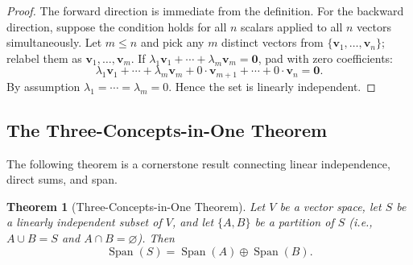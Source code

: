 \documentclass[11pt, a4paper, notitlepage]{report}
\newtheorem{theorem}{Theorem}[section]
\theoremstyle{definition}
\theoremstyle{remark}
\begin{document}
\begin{proof}
The forward direction is immediate from the definition. For the backward direction, suppose the condition holds for all $n$ scalars applied to all $n$ vectors simultaneously. Let $m \leq n$ and pick any $m$ distinct vectors from $\{\mathbf{v}_1, \ldots, \mathbf{v}_n\}$; relabel them as $\mathbf{v}_1, \ldots, \mathbf{v}_m$. If $\lambda_1 \mathbf{v}_1 + \cdots + \lambda_m \mathbf{v}_m = \mathbf{0}$, pad with zero coefficients:
\[
  \lambda_1 \mathbf{v}_1 + \cdots + \lambda_m \mathbf{v}_m + 0 \cdot \mathbf{v}_{m+1} + \cdots + 0 \cdot \mathbf{v}_n = \mathbf{0}.
\]
By assumption $\lambda_1 = \cdots = \lambda_m = 0$. Hence the set is linearly independent.
\end{proof}

\subsection{The Three-Concepts-in-One Theorem}

The following theorem is a cornerstone result connecting linear independence, direct sums, and span.

\begin{theorem}[Three-Concepts-in-One Theorem]\label{thm:3in1}
Let $V$ be a vector space, let $S$ be a linearly independent subset of $V$, and let $\{A, B\}$ be a partition of $S$ (i.e., $A \cup B = S$ and $A \cap B = \varnothing$). Then
\[
  \operatorname{Span}(S) = \operatorname{Span}(A) \oplus \operatorname{Span}(B).
\]
\end{theorem}
\end{document}
